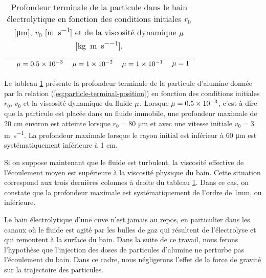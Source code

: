 \begin{table}
  \begin{center}
    \caption{Profondeur terminale de la particule dans le bain
      électrolytique en fonction des conditions initiales $r_0$
      [\si{\micro\meter}], $v_0$ [\si{\meter\per\second}] et de la
      viscosité dynamique $\mu$
      [\si{\kilo\gram\per\meter\per\second}].}
    \label{tab:fall-results}
    \begin{tabularx}{\textwidth}{@{}lXXXX@{}}
      \toprule
      & $\mu = \num{0.5e-3}$ & $\mu = \num{1e-2}$ & $\mu = \num{1e-1}$ & $\mu = \num{1}$ \\
      \midrule
      
      \bottomrule
    \end{tabularx}
  \end{center}
\end{table}

Le tableau \ref{tab:fall-results} présente la profondeur
terminale de la particule d'alumine donnée par la relation
(\ref{eq:particle-terminal-position}) en fonction des conditions
initiales $r_0$, $v_0$ et la viscosité dynamique du fluide
$\mu$. Lorsque $\mu =
\num{0.5e-3}$, c'est-à-dire que la particule est placée dans un fluide
immobile, une profondeur maximale de \num{20} \si{\centi\meter}
environ est atteinte lorsque $r_0 = \num{80}$ \si{\micro\meter} et
avec une vitesse initiale $v_0 = \num{3}$ \si{\meter\per\second}. La
profondeur maximale lorsque le rayon initial est inférieur à
\num{60} \si{\micro\meter} est systématiquement inférieure à
\num{1} \si{\centi\meter}.

Si on suppose maintenant que le fluide est turbulent, la viscosité
effective de l'écoulement moyen est supérieure à la viscosité
physique du bain. Cette situation correspond aux trois dernières
colonnes à droite du tableau \ref{tab:fall-results}. Dans ce cas, on
constate que la profondeur maximale est systématiquement de l'ordre de
\num{1}\si{\milli\meter}, ou inférieure.

Le bain électrolytique d'une cuve n'est jamais au repos, en
particulier dans les canaux où le fluide est agité par les bulles de
gaz qui résultent de l'électrolyse et qui remontent à la surface du
bain. Dans la suite de ce travail, nous ferons l'hypothèse que
l'injection des doses de particules d'alumine ne perturbe pas
l'écoulement du bain. Dans ce cadre, nous négligerons l'effet de la
force de gravité sur la trajectoire des particules.

